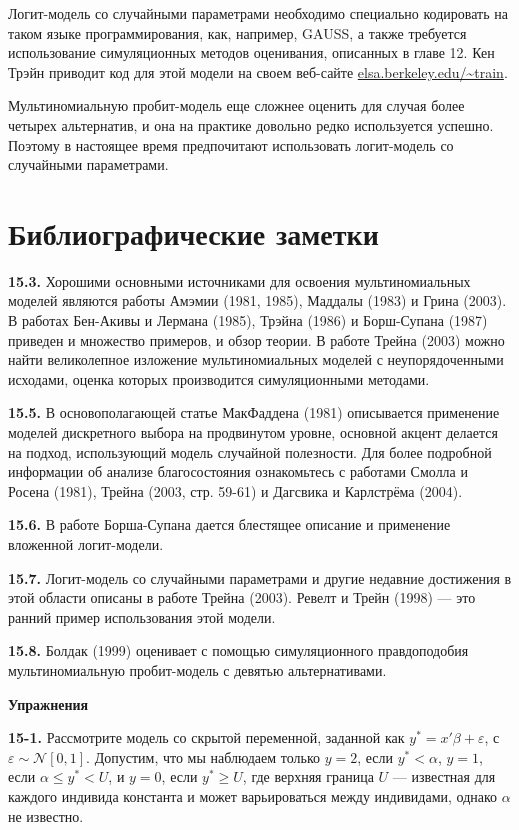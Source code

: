 Логит-модель со случайными параметрами необходимо специально кодировать на таком языке программирования, как, например, GAUSS, а также требуется использование симуляционных методов оценивания, описанных в главе 12. Кен Трэйн приводит код для этой модели на своем веб-сайте \url{elsa.berkeley.edu/~train}.

Мультиномиальную пробит-модель еще сложнее оценить для случая более четырех альтернатив, и она на практике довольно редко используется успешно. Поэтому в настоящее время предпочитают использовать логит-модель со случайными параметрами.

\section{Библиографические заметки}

\textbf{15.3.} Хорошими основными источниками для освоения мультиномиальных моделей являются работы Амэмии (1981, 1985), Маддалы (1983) и Грина (2003). В работах Бен-Акивы и Лермана (1985), Трэйна (1986) и Борш-Супана (1987) приведен и множество примеров, и обзор теории. В работе Трейна (2003) можно найти великолепное изложение мультиномиальных моделей с неупорядоченными исходами, оценка которых производится симуляционными методами.

\textbf{15.5.} В основополагающей статье МакФаддена (1981) описывается применение моделей дискретного выбора на продвинутом уровне, основной акцент делается на подход, использующий модель случайной полезности. Для более подробной информации об анализе благосостояния ознакомьтесь с работами Смолла и Росена (1981), Трейна (2003, стр. 59-61) и Дагсвика и Карлстрёма (2004).

\textbf{15.6.} В работе Борша-Супана дается блестящее описание и применение вложенной логит-модели.

\textbf{15.7.} Логит-модель со случайными параметрами и другие недавние достижения в этой области описаны в работе Трейна (2003). Ревелт и Трейн (1998) --- это ранний пример использования этой модели.

\textbf{15.8.} Болдак (1999) оценивает с помощью симуляционного правдоподобия мультиномиальную пробит-модель с девятью альтернативами.

\textbf{Упражнения}

\textbf{15-1. } Рассмотрите модель со скрытой переменной, заданной как $y^*=x'\beta +\varepsilon $, с $\varepsilon \sim {\mathcal N}[0, 1]$. Допустим, что мы наблюдаем только $y=2$, если $y^*<\alpha $, $y=1$, если $\alpha \le y^*<U$, и $y=0$, если $y^*\ge U$, где верхняя граница $U$ --- известная для каждого индивида константа и может варьироваться между индивидами, однако $\alpha $ не известно.

